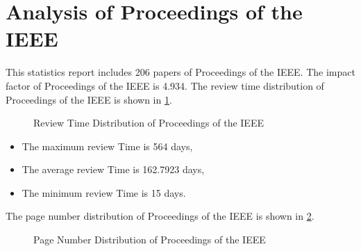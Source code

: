 \documentclass[12pt,
               a4paper,
               journal,
               onecolumn]{IEEEtran}
\begin{document}
\section{Analysis of Proceedings of the IEEE}
This statistics report includes 206 papers of Proceedings of the IEEE. The impact factor of Proceedings of the IEEE is 4.934. The review time distribution of Proceedings of the IEEE is shown in \cref{fig:Review Time Distribution of Proceedings of the IEEE}.
\begin{figure}[htb]
  \centering
  \caption{Review Time Distribution of Proceedings of the IEEE}
  \label{fig:Review Time Distribution of Proceedings of the IEEE}
\end{figure}

\begin{itemize}
  \item The maximum review Time is 564 days,
  \item The average review Time is 162.7923 days,
  \item The minimum review Time is 15 days.
\end{itemize}

The page number distribution of Proceedings of the IEEE is shown in \cref{fig:Page Number Distribution of Proceedings of the IEEE}.
\begin{figure}[htb]
  \centering
  \caption{Page Number Distribution of Proceedings of the IEEE}
  \label{fig:Page Number Distribution of Proceedings of the IEEE}
\end{figure}
\end{document}
